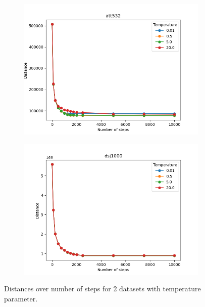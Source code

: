 \begin{figure}[!htb]
	\centering
	\begin{subfigure}{0.45\textwidth}
		\includegraphics[width=\textwidth]{img/att532_temperature}
	\end{subfigure}
	\begin{subfigure}{0.45\textwidth}
		\includegraphics[width=\textwidth]{img/dsj1000_temperature}
	\end{subfigure}
	\caption{Distances over number of steps for 2 datasets with temperature parameter.}
	\label{fig:temperature_2}
\end{figure}